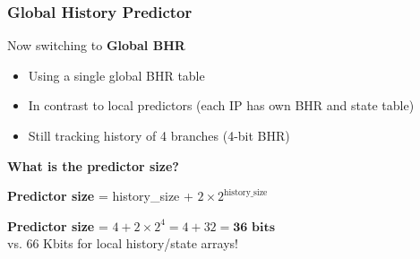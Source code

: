 \documentclass[aspectratio=169,12pt]{beamer}
\begin{document}
\begin{frame}
  \frametitle{Global History Predictor}
  \begin{center}
    \Large Now switching to \textbf{Global BHR}
  \end{center}

  \vspace{0.5em}

  \begin{itemize}
    \item Using a single global BHR table
    \item In contrast to local predictors (each IP has own BHR and state table)
    \item Still tracking history of 4 branches (4-bit BHR)
  \end{itemize}

  \vspace{0.5em}
  \textbf{What is the predictor size?}

  \pause
  \vspace{-0.1em}
  \begin{tcolorbox}[colback=blue!10, colframe=blue!50, title=Formula]
    \small
    \textbf{Predictor size} = history\_size + $2 \times 2^{\text{history\_size}}$
  \end{tcolorbox}

  \pause
  \vspace{-0.8em}
  \begin{tcolorbox}[colback=green!10, colframe=green!50]
    \centering
    \textbf{Predictor size} = $4 + 2 \times 2^4 = 4 + 32 = \textbf{36 bits}$\\[0.3em]
    \textcolor{correctgreen}{vs. 66 Kbits for local history/state arrays!}
  \end{tcolorbox}
\end{frame}





\end{document}
